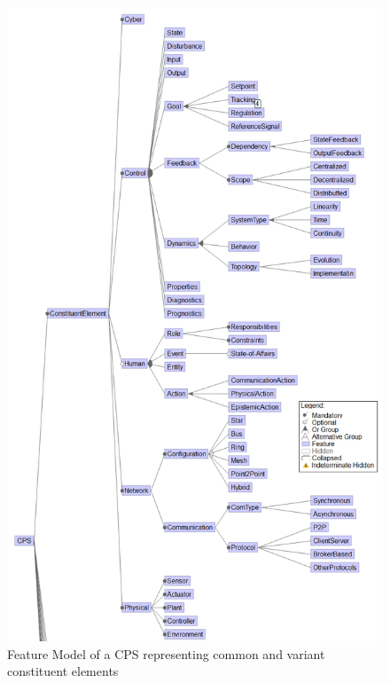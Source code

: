 \documentclass[final]{include/MPM4CPS/MPM4CPS-Report} %
\begin{document}
\begin{figure}[!htb]
\includegraphics[width=\textwidth]{figures/cps-ontology-constituent.png}  %
\caption{Feature Model of a CPS representing common and variant constituent elements}
\label{fig:feature_model_cps_constituent}
\end{figure}


\end{document}
